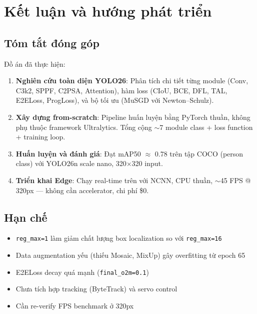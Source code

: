 \chapter{Kết luận và hướng phát triển}
\label{ch:conclusion}

\section{Tóm tắt đóng góp}

Đồ án đã thực hiện:

\begin{enumerate}
    \item \textbf{Nghiên cứu toàn diện YOLO26}: Phân tích chi tiết từng module (Conv, C3k2, SPPF, C2PSA, Attention), hàm loss (CIoU, BCE, DFL, TAL, E2ELoss, ProgLoss), và bộ tối ưu (MuSGD với Newton--Schulz).

    \item \textbf{Xây dựng from-scratch}: Pipeline huấn luyện bằng PyTorch thuần, không phụ thuộc framework Ultralytics. Tổng cộng $\sim$7 module class + loss function + training loop.

    \item \textbf{Huấn luyện và đánh giá}: Đạt mAP50 $\approx$ 0.78 trên tập COCO (person class) với YOLO26n scale nano, 320$\times$320 input.

    \item \textbf{Triển khai Edge}: Chạy real-time trên \rpi với NCNN, CPU thuần, $\sim$45 FPS @ 320px --- không cần accelerator, chi phí \$0.
\end{enumerate}

\section{Hạn chế}

\begin{itemize}
    \item \texttt{reg\_max=1} làm giảm chất lượng box localization so với \texttt{reg\_max=16}
    \item Data augmentation yếu (thiếu Mosaic, MixUp) gây overfitting từ epoch 65
    \item E2ELoss decay quá mạnh (\texttt{final\_o2m=0.1})
    \item Chưa tích hợp tracking (ByteTrack) và servo control
    \item Cần re-verify FPS benchmark ở 320px
\end{itemize}

